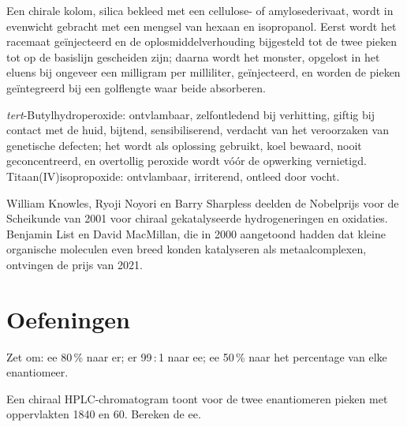 \begin{inthelab}
Een chirale kolom, silica bekleed met een cellulose- of
amylosederivaat, wordt in evenwicht gebracht met een mengsel van hexaan
en isopropanol. Eerst wordt het racemaat geïnjecteerd en de
oplosmiddelverhouding bijgesteld tot de twee pieken tot op de basislijn
gescheiden zijn; daarna wordt het monster, opgelost in het eluens bij
ongeveer een milligram per milliliter, geïnjecteerd, en worden de pieken
geïntegreerd bij een golflengte waar beide absorberen.
\end{inthelab}

\begin{safety}{}
\textit{tert}-Butylhydroperoxide: ontvlambaar, zelfontledend bij
verhitting, giftig bij contact met de huid, bijtend, sensibiliserend,
verdacht van het veroorzaken van genetische defecten; het wordt als
oplossing gebruikt, koel bewaard, nooit geconcentreerd, en overtollig
peroxide wordt vóór de opwerking vernietigd. Titaan(IV)isopropoxide:
ontvlambaar, irriterend, ontleed door vocht.
\end{safety}

\begin{history}
William Knowles, Ryoji Noyori en Barry Sharpless deelden de Nobelprijs
voor de Scheikunde van 2001 voor chiraal gekatalyseerde hydrogeneringen
en oxidaties. Benjamin List en David MacMillan, die in 2000 aangetoond
hadden dat kleine organische moleculen  even
breed konden katalyseren als metaalcomplexen, ontvingen de prijs van
2021.
\end{history}

\section{Oefeningen}

\begin{exercise}[$\star$]\label{exo:b3:asymmetric-synthesis:1}
Zet om: ee 80\,\% naar er; er 99\,:\,1 naar ee; ee 50\,\% naar het
percentage van elke enantiomeer.
\end{exercise}

\begin{exercise}[$\star$]\label{exo:b3:asymmetric-synthesis:2}
Een chiraal HPLC-chromatogram toont voor de twee enantiomeren pieken met
oppervlakten 1840 en 60. Bereken de ee.
\end{exercise}


